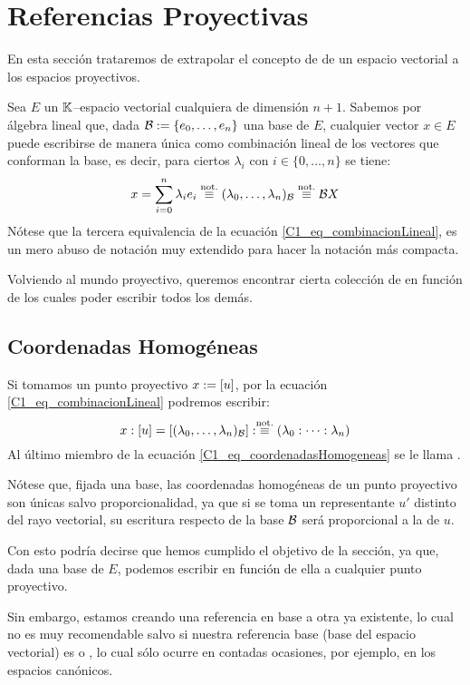 \section{Referencias Proyectivas}
En esta sección trataremos de extrapolar el concepto de  de un espacio vectorial a los espacios proyectivos.

Sea $E$ un $\mathbb{K}$--espacio vectorial cualquiera de dimensión $n+1$. Sabemos por álgebra lineal que, dada $\mathcal{B}:=\{e_0,\dots,e_n\}$ una base de $E$, cualquier vector $x\in E$ puede escribirse de manera única como combinación lineal de los vectores que conforman la base, es decir, para ciertos $\lambda_i$ con $i\in\{0,\dots,n\}$ se tiene:
\begin{equation}
\label{C1_eq_combinacionLineal}
x=\sum_{i=0}^{n}\lambda_ie_i\stackrel{\textrm{not.}}{\equiv}(\lambda_0,\dots,\lambda_n)_{\mathcal{B}}\stackrel{\textrm{not.}}{\equiv}\mathcal{B}X
\end{equation}
Nótese que la tercera equivalencia de la ecuación \ref{C1_eq_combinacionLineal}, es un mero abuso de notación muy extendido para hacer la notación más compacta.

Volviendo al mundo proyectivo, queremos encontrar cierta colección de  en función de los cuales poder escribir todos los demás. 
\subsection{Coordenadas Homogéneas}
\label{C1_coordenadasHomogeneas}
Si tomamos un punto proyectivo $x:=\left [ u \right ]$, por la ecuación \ref{C1_eq_combinacionLineal} podremos escribir:
\begin{equation}
	\label{C1_eq_coordenadasHomogeneas}
	x:\left [ u \right ]=\left [ (\lambda_0,\dots,\lambda_n)_{\mathcal{B}} \right ]:\stackrel{\textrm{not.}}{\equiv}(\lambda_0:\dots:\lambda_n)
\end{equation}
Al último miembro de la ecuación \ref{C1_eq_coordenadasHomogeneas} se le llama .

Nótese que, fijada una base, las coordenadas homogéneas de un punto proyectivo son únicas salvo proporcionalidad, ya que si se toma un representante $u'$ distinto del rayo vectorial, su escritura respecto de la base $\mathcal{B}$ será proporcional a la de $u$.

Con esto podría decirse que hemos cumplido el objetivo de la sección, ya que, dada una base de $E$, podemos escribir en función de ella a cualquier punto proyectivo.

Sin embargo, estamos creando una referencia en base a otra ya existente, lo cual no es muy recomendable salvo si nuestra referencia base (base del espacio vectorial) es  o , lo cual sólo ocurre en contadas ocasiones, por ejemplo, en los espacios canónicos.
